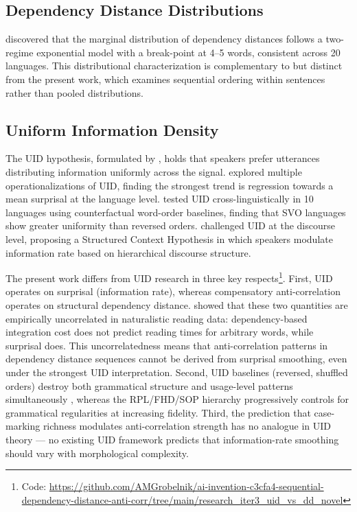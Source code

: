 \documentclass[11pt,letterpaper]{article}
\begin{document}
\subsection{Dependency Distance Distributions}

\citet{Petrini2022} discovered that the marginal distribution of dependency distances follows a two-regime exponential model with a break-point at 4--5 words, consistent across 20 languages. This distributional characterization is complementary to but distinct from the present work, which examines sequential ordering within sentences rather than pooled distributions.

\subsection{Uniform Information Density}

The UID hypothesis, formulated by \citet{Jaeger2010}, holds that speakers prefer utterances distributing information uniformly across the signal. \citet{Meister2021} explored multiple operationalizations of UID, finding the strongest trend is regression towards a mean surprisal at the language level. \citet{Clark2023} tested UID cross-linguistically in 10 languages using counterfactual word-order baselines, finding that SVO languages show greater uniformity than reversed orders. \citet{Tsipidi2024} challenged UID at the discourse level, proposing a Structured Context Hypothesis in which speakers modulate information rate based on hierarchical discourse structure.

The present work differs from UID research in three key respects\footnote{Code: \url{https://github.com/AMGrobelnik/ai-invention-c3cfa4-sequential-dependency-distance-anti-corr/tree/main/research_iter3_uid_vs_dd_novel}}. First, UID operates on surprisal (information rate), whereas compensatory anti-correlation operates on structural dependency distance. \citet{Demberg2008} showed that these two quantities are empirically uncorrelated in naturalistic reading data: dependency-based integration cost does not predict reading times for arbitrary words, while surprisal does. This uncorrelatedness means that anti-correlation patterns in dependency distance sequences cannot be derived from surprisal smoothing, even under the strongest UID interpretation. Second, UID baselines (reversed, shuffled orders) destroy both grammatical structure and usage-level patterns simultaneously \citep{Clark2023}, whereas the RPL/FHD/SOP hierarchy progressively controls for grammatical regularities at increasing fidelity. Third, the prediction that case-marking richness modulates anti-correlation strength has no analogue in UID theory --- no existing UID framework predicts that information-rate smoothing should vary with morphological complexity.
\end{document}
